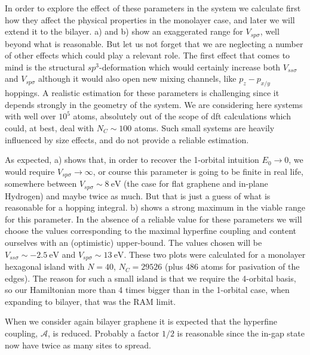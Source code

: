 In order to explore the effect of these parameters in the system we calculate first how they affect the physical properties in the monolayer case, and later we will extend it to the bilayer.
a) and b) show an exaggerated range for $V_{sp\sigma}$, well beyond what is reasonable. But let us not forget that we are neglecting a number of other effects which could play a relevant role. The first effect that comes to mind is the structural $sp^3$-deformation which would certainly increase both $V_{ss\sigma}$ and $V_{sp\sigma}$ although it would also open new mixing channels, like $p_z-p_{x/y}$ hoppings.
A realistic estimation for these parameters is challenging since it depends strongly in the geometry of the system. We are considering here systems with well over $10^5$ atoms, absolutely out of the scope of \ac{dft} calculations which could, at best, deal with $N_C\sim100$ atoms. Such small systems are heavily influenced by size effects, and do not provide a reliable estimation.



As expected, a) shows that, in order to recover the 1-orbital intuition $E_0\to 0$, we would require $V_{sp\sigma}\to\infty$, or course this parameter is going to be finite in real life, somewhere between $V_{sp\sigma}\sim\SI{8}{\eV}$ (the case for flat graphene and in-plane Hydrogen) and maybe twice as much. But that is just a guess of what is reasonable for a hopping integral.
b) shows a strong maximum in the viable range for this parameter.
In the absence of a reliable value for these parameters we will choose the values corresponding to the maximal hyperfine coupling and content ourselves with an (optimistic) upper-bound. The values chosen will be $V_{ss\sigma}\sim\SI{-2.5}{\eV}$ and $V_{sp\sigma}\sim\SI{13}{\eV}$.
These two plots were calculated for a monolayer hexagonal island with $N=40$, $N_C=29526$ (plus 486  atoms for pasivation of the edges). The reason for such a small island is that we require the 4-orbital basis, so our Hamiltonian more than 4 times bigger than in the 1-orbital case, when expanding to bilayer, that was the RAM limit.


When we consider again bilayer graphene it is expected that the hyperfine coupling, $\mathcal{A}$, is reduced. Probably a factor $1/2$ is reasonable since the in-gap state now have twice as many sites to spread. 

